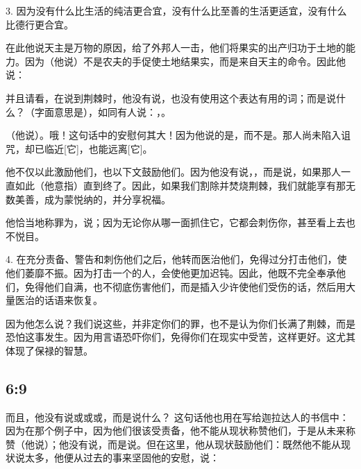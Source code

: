 3. 因为没有什么比生活的纯洁更合宜，没有什么比至善的生活更适宜，没有什么比德行更合宜。\par

在此他说天主是万物的原因，给了外邦人一击，他们将果实的出产归功于土地的能力。因为（他说）不是农夫的手促使土地结果实，而是来自天主的命令。因此他说：\par

并且请看，在说到荆棘时，他没有说，也没有使用这个表达有用的词；而是说什么？（字面意思是），如同有人说：，。\par

（他说）。哦！这句话中的安慰何其大！因为他说的是，而不是。那人尚未陷入诅咒，却已临近[它]，也能远离[它]。\par

他不仅以此激励他们，也以下文鼓励他们。因为他没有说，，而是说，如果那人一直如此（他意指）直到终了。因此，如果我们割除并焚烧荆棘，我们就能享有那无数美善，成为蒙悦纳的，并分享祝福。\par

他恰当地称罪为，说；因为无论你从哪一面抓住它，它都会刺伤你，甚至看上去也不悦目。\par

4. 在充分责备、警告和刺伤他们之后，他转而医治他们，免得过分打击他们，使他们萎靡不振。因为打击一个的人，会使他更加迟钝。因此，他既不完全奉承他们，免得他们自满，也不彻底伤害他们，而是插入少许使他们受伤的话，然后用大量医治的话语来恢复。\par

因为他怎么说？我们说这些，并非定你们的罪，也不是认为你们长满了荆棘，而是恐怕这事发生。因为用言语恐吓你们，免得你们在现实中受苦，这样更好。这尤其体现了保禄的智慧。\par


\subsection{ 6:9}

而且，他没有说或或或，而是说什么？ 这句话他也用在写给迦拉达人的书信中： 因为在那个例子中，因为他们很该受责备，他不能从现状称赞他们，于是从未来称赞（他说）；他没有说，而是说。但在这里，他从现状鼓励他们：既然他不能从现状说太多，他便从过去的事来坚固他的安慰，说：\par

